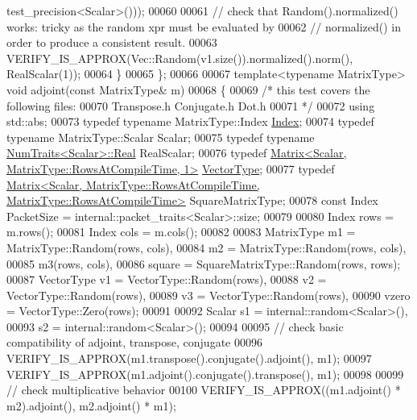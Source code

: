 \begin{DoxyCode}
      test\_precision<Scalar>()));
00060     
00061     \textcolor{comment}{// check that Random().normalized() works: tricky as the random xpr must be evaluated by}
00062     \textcolor{comment}{// normalized() in order to produce a consistent result.}
00063     VERIFY\_IS\_APPROX(Vec::Random(v1.size()).normalized().norm(), RealScalar(1));
00064   \}
00065 \};
00066 
00067 \textcolor{keyword}{template}<\textcolor{keyword}{typename} MatrixType> \textcolor{keywordtype}{void} adjoint(\textcolor{keyword}{const} MatrixType& m)
00068 \{
00069   \textcolor{comment}{/* this test covers the following files:}
00070 \textcolor{comment}{     Transpose.h Conjugate.h Dot.h}
00071 \textcolor{comment}{  */}
00072   \textcolor{keyword}{using} std::abs;
00073   \textcolor{keyword}{typedef} \textcolor{keyword}{typename} MatrixType::Index \hyperlink{namespace_eigen_a62e77e0933482dafde8fe197d9a2cfde}{Index};
00074   \textcolor{keyword}{typedef} \textcolor{keyword}{typename} MatrixType::Scalar Scalar;
00075   \textcolor{keyword}{typedef} \textcolor{keyword}{typename} \hyperlink{group___core___module_struct_eigen_1_1_num_traits}{NumTraits<Scalar>::Real} RealScalar;
00076   \textcolor{keyword}{typedef} \hyperlink{group___core___module_class_eigen_1_1_matrix}{Matrix<Scalar, MatrixType::RowsAtCompileTime, 1>} 
      \hyperlink{struct_vector_type}{VectorType};
00077   \textcolor{keyword}{typedef} 
      \hyperlink{group___core___module_class_eigen_1_1_matrix}{Matrix<Scalar, MatrixType::RowsAtCompileTime, MatrixType::RowsAtCompileTime>}
       SquareMatrixType;
00078   \textcolor{keyword}{const} Index PacketSize = internal::packet\_traits<Scalar>::size;
00079   
00080   Index rows = m.rows();
00081   Index cols = m.cols();
00082 
00083   MatrixType m1 = MatrixType::Random(rows, cols),
00084              m2 = MatrixType::Random(rows, cols),
00085              m3(rows, cols),
00086              square = SquareMatrixType::Random(rows, rows);
00087   VectorType v1 = VectorType::Random(rows),
00088              v2 = VectorType::Random(rows),
00089              v3 = VectorType::Random(rows),
00090              vzero = VectorType::Zero(rows);
00091 
00092   Scalar s1 = internal::random<Scalar>(),
00093          s2 = internal::random<Scalar>();
00094 
00095   \textcolor{comment}{// check basic compatibility of adjoint, transpose, conjugate}
00096   VERIFY\_IS\_APPROX(m1.transpose().conjugate().adjoint(),    m1);
00097   VERIFY\_IS\_APPROX(m1.adjoint().conjugate().transpose(),    m1);
00098 
00099   \textcolor{comment}{// check multiplicative behavior}
00100   VERIFY\_IS\_APPROX((m1.adjoint() * m2).adjoint(),           m2.adjoint() * m1);

\end{DoxyCode}
